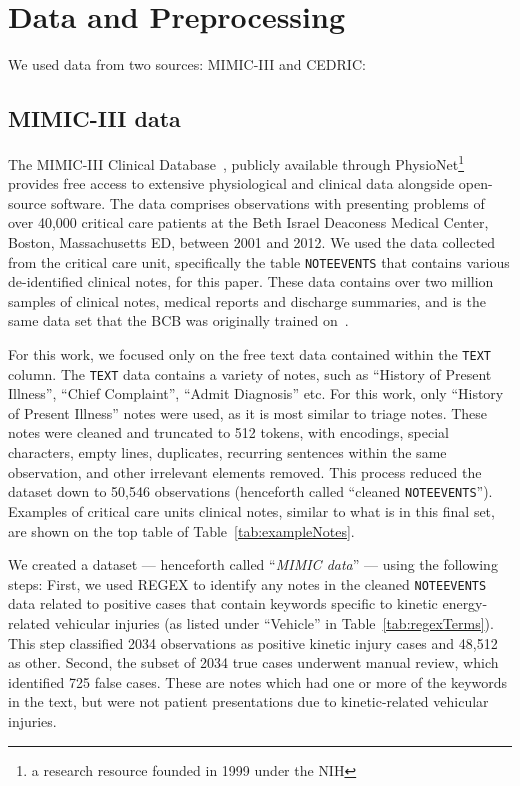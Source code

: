 \documentclass[a4paper,12pt]{article}
\newcommand{\mimic}{\ac{MIMIC}-III\xspace}
\newcommand{\cedric}{\ac{CEDRIC}\xspace}
\newcommand{\mimicData}{MIMIC data\xspace}   %
\begin{document}
\section{Data and Preprocessing}
\label{sec:data}

We used data from two sources: \ac{MIMIC}-III and \cedric: 

\subsection{MIMIC-III data}

The \mimic Clinical Database~\cite{johnson2016mimic3db}, publicly available through PhysioNet\footnote{a research resource founded in 1999 under the \ac{NIH}}~\cite{goldberger2000physiobank} provides free access to extensive physiological and clinical data alongside open-source software. The data comprises observations with presenting problems of over 40,000 critical care patients at the Beth Israel Deaconess Medical Center, Boston, Massachusetts \ac{ED}, between 2001 and 2012. 
We used the data collected from the critical care unit, specifically the table \texttt{NOTEEVENTS} that contains various de-identified clinical notes, for this paper. These data contains over two million samples of clinical notes, medical reports and discharge summaries, and is the same data set that the \ac{BCB} was originally trained on~\cite{alsentzer2019publicly}. 

For this work, we focused only on the free text data contained within the \texttt{TEXT} column. The \texttt{TEXT} data contains a variety of notes, 
such as ``History of Present Illness'', ``Chief Complaint'', ``Admit Diagnosis'' etc. For this work, only ``History of Present Illness'' notes were used, as it is most similar to triage notes. 
These notes were cleaned and truncated to 512 tokens, with encodings, special characters, empty lines, duplicates, recurring sentences within the same observation, and other irrelevant elements removed. This process reduced the dataset down to 
50,546 observations (henceforth called ``cleaned \texttt{NOTEEVENTS}''). Examples of critical care units clinical notes, similar to what is in this final set, are shown on the top table of Table~\ref{tab:exampleNotes}. 

We created a dataset --- henceforth called ``\emph{\mimicData}'' --- using the following steps: First, we used \ac{REGEX} to identify any notes in the cleaned \texttt{NOTEEVENTS} data related to positive cases that contain keywords specific to kinetic energy-related vehicular injuries (as listed under ``Vehicle'' in Table~\ref{tab:regexTerms}). 
This step classified 2034 observations as positive kinetic injury cases and 48,512 as other. Second, the subset of 2034 true cases underwent manual review, which identified 
725 
false cases. These are notes which had one or more of the keywords in the text, but were not patient presentations due to kinetic-related vehicular injuries. 
\end{document}
